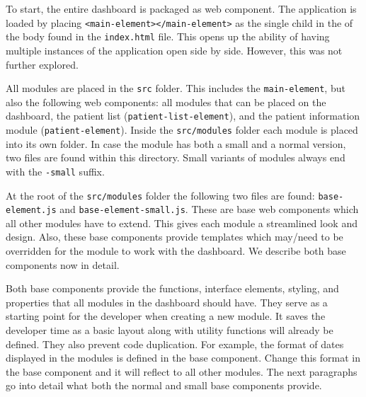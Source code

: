         To start, the entire dashboard is packaged as web component. The application is loaded by placing \texttt{<main-element></main-element>} as the single child in the of the body found in the \texttt{index.html} file. This opens up the ability of having multiple instances of the application open side by side. However, this was not further explored.

        All modules are placed in the \texttt{src} folder. This includes the \texttt{main-element}, but also the following web components: all modules that can be placed on the dashboard, the patient list (\texttt{patient-list-element}), and the patient information module (\texttt{patient-element}). Inside the \texttt{src/modules} folder each module is placed into its own folder. In case the module has both a small and a normal version, two files are found within this directory. Small variants of modules always end with the \texttt{-small} suffix.

        At the root of the \texttt{src/modules} folder the following two files are found: \texttt{base-element.js} and \texttt{base-element-small.js}. These are base web components which all other modules have to extend. This gives each module a streamlined look and design. Also, these base components provide templates which may/need to be overridden for the module to work with the dashboard. We describe both base components now in detail.

            \label{base_components}

            Both base components provide the functions, interface elements, styling, and properties that all modules in the dashboard should have. They serve as a starting point for the developer when creating a new module. It saves the developer time as a basic layout along with utility functions will already be defined. They also prevent code duplication. For example, the format of dates displayed in the modules is defined in the base component. Change this format in the base component and it will reflect to all other modules. The next paragraphs go into detail what both the normal and small base components provide.


